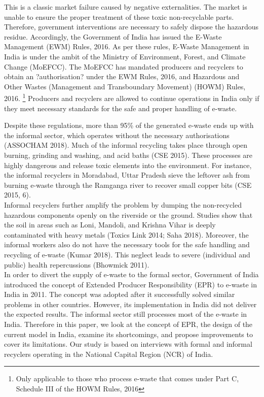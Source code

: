 \documentclass[a4paper, 12pt]{article}
\begin{document}
                    This is a classic market failure caused by negative externalities. The market is unable to ensure the proper treatment of these toxic non-recyclable parts. Therefore,  government interventions are necessary to safely dispose the hazardous residue. Accordingly, the Government of India has issued the E-Waste Management (EWM) Rules, 2016. As per these rules, E-Waste Management in India is under the ambit of the Ministry of Environment, Forest, and Climate Change (MoEFCC). The MoEFCC has mandated producers and recyclers to obtain an ?authorisation? under the EWM Rules, 2016, and Hazardous and Other Wastes (Management and Transboundary Movement) (HOWM) Rules, 2016. \footnote{Only applicable to those who process e-waste that comes under Part C, Schedule III of the HOWM Rules, 2016} Producers and recyclers are allowed to continue operations in India only if they meet necessary standards for the  safe and proper handling of e-waste.
                     
                    Despite these regulations, more than 95\% of the generated e-waste ends up with the informal sector, which operates without the necessary authorisations (ASSOCHAM 2018). Much of the informal recycling takes place through open burning, grinding and washing, and acid baths (CSE 2015). These processes are highly dangerous and release toxic elements into the environment. For instance, the informal recyclers in Moradabad, Uttar Pradesh sieve the leftover ash from burning e-waste through the Ramganga river to recover small copper bits (CSE 2015, 6). \\
                    
                    Informal recyclers further amplify the problem by dumping the non-recycled hazardous components openly on the riverside or the ground. Studies show that the soil in areas such as Loni, Mandoli, and Krishna Vihar is deeply contaminated with heavy metals (Toxics Link 2014; Saha 2018). Moreover, the informal workers also do not have the necessary tools for the safe handling and recycling of e-waste (Kumar 2018). This neglect leads to severe (individual and public) health repercussions (Bhowmick 2011). \\
                    
                    In order to divert the supply of e-waste to the formal sector, Government of India introduced the concept of Extended Producer Responsibility (EPR) to e-waste in India in 2011. The concept was adopted after it successfully solved similar problems in other countries. However, its implementation in India did not deliver the expected results. The informal sector still processes most of the e-waste in India. Therefore in this paper, we look at the concept of EPR, the design of the current model in India, examine its shortcomings, and propose improvements to cover its limitations. Our study is based on interviews with formal and informal recyclers operating in the National Capital Region (NCR) of India. 
                    
\end{document}
